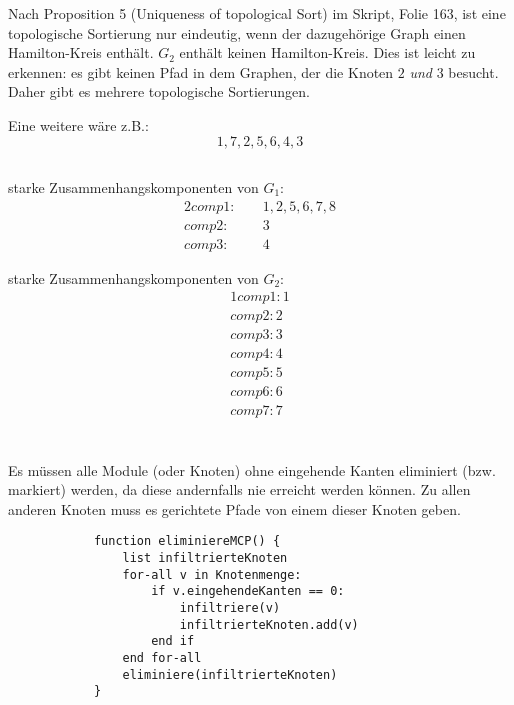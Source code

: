 \documentclass[10pt,a4paper,oneside,ngerman,numbers=noenddot]{scrartcl}
\begin{document}
          Nach Proposition 5 (Uniqueness of topological Sort) im Skript, Folie 163, ist eine topologische Sortierung nur eindeutig, wenn der dazugehörige Graph einen Hamilton-Kreis enthält. $G_2$ enthält keinen Hamilton-Kreis. Dies ist leicht zu erkennen: es gibt keinen Pfad in dem Graphen, der die Knoten $2$ \textit{und} $3$ besucht. Daher gibt es mehrere topologische Sortierungen.
          
          Eine weitere wäre z.B.:
          \[
                1, 7, 2, 5, 6, 4, 3
          \]
	\subsection{} %
		starke Zusammenhangskomponenten von $G_{1}:$
		\begin{alignat*}{2}
			comp1:&&\; 1, 2, 5, 6, 7, 8 \\
			comp2:&&\; 3 \\
			comp3:&&\; 4
		\end{alignat*}
		
		starke Zusammenhangskomponenten von $G_{2}:$
		\begin{alignat*}{1}
			comp1: 1 \\
			comp2: 2 \\
			comp3: 3 \\
			comp4: 4 \\
			comp5: 5 \\
			comp6: 6 \\
			comp7: 7
		\end{alignat*}
\section{} %
	\subsection{} %
        Es müssen alle Module (oder Knoten) ohne eingehende Kanten eliminiert (bzw. markiert) werden, da diese andernfalls nie erreicht werden können. Zu allen anderen Knoten muss es gerichtete Pfade von einem dieser Knoten geben.
        \begin{verbatim}
            function eliminiereMCP() {
                list infiltrierteKnoten
                for-all v in Knotenmenge:
                    if v.eingehendeKanten == 0:
                        infiltriere(v)
                        infiltrierteKnoten.add(v)
                    end if
                end for-all
                eliminiere(infiltrierteKnoten)
            }
                \end{verbatim}
\end{document}
